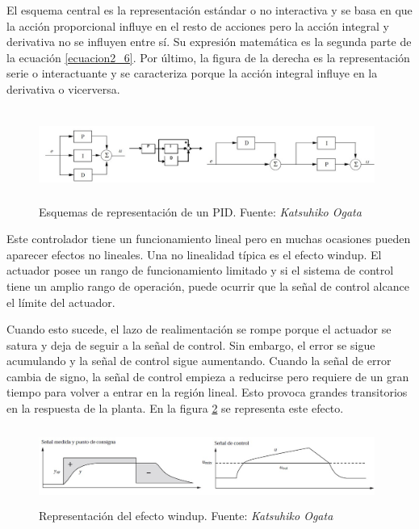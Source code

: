 	 El esquema central es la representación estándar o no interactiva y se basa en que la acción proporcional influye en el resto de acciones pero la acción integral y derivativa no se influyen entre sí. Su expresión matemática es la segunda parte de la ecuación \ref{ecuacion2_6}. Por último, la figura de la derecha es la representación serie o interactuante y se caracteriza porque la acción integral influye en la derivativa o vicerversa.

\begin{figure}[htbp]
\centering
\includegraphics[width=110mm,height=30mm]{imagenes/capitulo2/2_5_PID}
\caption {Esquemas de representación de un PID. Fuente: \textit{Katsuhiko Ogata} \cite{control3}}
\label{fig2_5:PID}
\end{figure}

	Este controlador tiene un funcionamiento lineal pero en muchas ocasiones pueden aparecer efectos no lineales. Una no linealidad típica es el efecto windup. El actuador posee un rango de funcionamiento limitado y si el sistema de control tiene un amplio rango de operación, puede ocurrir que la señal de control alcance el límite del actuador.

	Cuando esto sucede, el lazo de realimentación se rompe porque el actuador se satura y deja de seguir a la señal de control. Sin embargo, el error se sigue acumulando y la señal de control sigue aumentando. Cuando la señal de error cambia de signo, la señal de control empieza a reducirse pero requiere de un gran tiempo para volver a entrar en la región lineal. Esto provoca grandes transitorios en la respuesta de la planta. En la figura \ref{fig2_6:windup} se representa este efecto.  

\begin{figure}[htbp]
\centering
\includegraphics[width=110mm,height=25mm]{imagenes/capitulo2/2_6_Windup}
\caption {Representación del efecto windup. Fuente: \textit{Katsuhiko Ogata} \cite{control3}}
\label{fig2_6:windup}
\end{figure}

